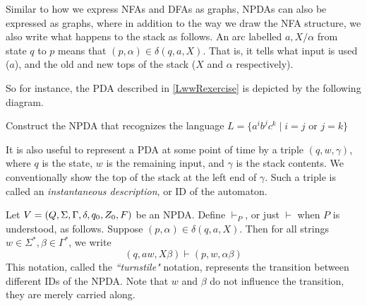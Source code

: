 \vspace{3mm}
Similar to how we express NFAs and DFAs as graphs, NPDAs can also be expressed as graphs, where in addition to the way we draw the NFA structure, we also write what happens to the stack as follows. An arc labelled $a,X/\alpha$ from state $q$ to $p$ means that $(p,\alpha)\in\delta(q,a,X)$. That is, it tells what input is used ($a$), and the old and new tops of the stack ($X$ and $\alpha$ respectively).

\vspace{3mm}
So for instance, the PDA described in \ref{LwwRexercise} is depicted by the following diagram.

\begin{center}
\end{center}

\begin{exercise}
Construct the NPDA that recognizes the language $L=\{a^ib^jc^k\mid i=j\text{ or }j=k\}$
\end{exercise}

It is also useful to represent a PDA at some point of time by a triple $(q,w,\gamma)$, where $q$ is the state, $w$ is the remaining input, and $\gamma$ is the stack contents. We conventionally show the top of the stack at the left end of $\gamma$. Such a triple is called an \textit{instantaneous description}, or ID of the automaton.

\vspace{3mm}
Let $V=(Q,\Sigma,\Gamma,\delta,q_0,Z_0,F)$ be an NPDA. Define $\vdash_P$, or just $\vdash$ when $P$ is understood, as follows. Suppose $(p,\alpha)\in\delta(q,a,X)$. Then for all strings $w\in\Sigma^*,\beta\in\Gamma^*$, we write
$$(q,aw,X\beta)\vdash(p,w,\alpha\beta)$$
This notation, called the \textit{``turnstile"} notation, represents the transition between different IDs of the NPDA. Note that $w$ and $\beta$ do not influence the transition, they are merely carried along.

